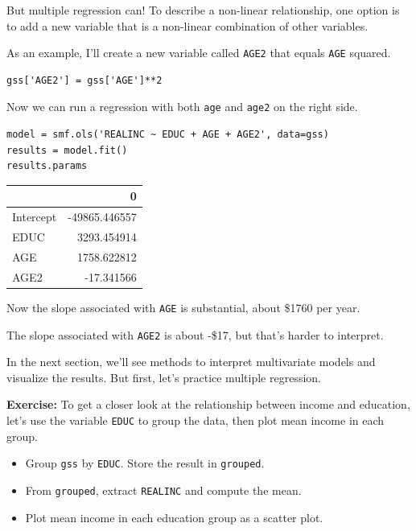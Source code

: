 But multiple regression can! To describe a non-linear relationship, one
option is to add a new variable that is a non-linear combination of
other variables.

As an example, I'll create a new variable called
\passthrough{\lstinline!AGE2!} that equals \passthrough{\lstinline!AGE!}
squared.

\begin{lstlisting}[]
gss['AGE2'] = gss['AGE']**2
\end{lstlisting}

Now we can run a regression with both \passthrough{\lstinline!age!} and
\passthrough{\lstinline!age2!} on the right side.

\begin{lstlisting}[]
model = smf.ols('REALINC ~ EDUC + AGE + AGE2', data=gss)
results = model.fit()
results.params
\end{lstlisting}

\begin{tabular}{lr}
\midrule
{} &             0 \\
\midrule
Intercept & -49865.446557 \\
EDUC      &   3293.454914 \\
AGE       &   1758.622812 \\
AGE2      &    -17.341566 \\
\midrule
\end{tabular}

Now the slope associated with \passthrough{\lstinline!AGE!} is
substantial, about \$1760 per year.

The slope associated with \passthrough{\lstinline!AGE2!} is about -\$17,
but that's harder to interpret.

In the next section, we'll see methods to interpret multivariate models
and visualize the results. But first, let's practice multiple
regression.

\textbf{Exercise:} To get a closer look at the relationship between
income and education, let's use the variable
\passthrough{\lstinline!EDUC!} to group the data, then plot mean income
in each group.

\begin{itemize}
\item
  Group \passthrough{\lstinline!gss!} by \passthrough{\lstinline!EDUC!}.
  Store the result in \passthrough{\lstinline!grouped!}.
\item
  From \passthrough{\lstinline!grouped!}, extract
  \passthrough{\lstinline!REALINC!} and compute the mean.
\item
  Plot mean income in each education group as a scatter plot.
\end{itemize}

